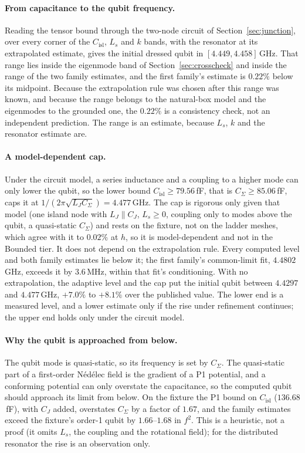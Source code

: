 \documentclass{anvil-paper}
\newcommand{\Cisl}{C_{\mathrm{isl}}}
\begin{document}
\paragraph{From capacitance to the qubit frequency.}
Reading the tensor bound through the two-node circuit of
Section~\ref{sec:junction}, over every corner of the $\Cisl$, $L_s$ and
$k$ bands, with the resonator at its extrapolated estimate, gives the
initial dressed qubit in $[4.449, 4.458]$\,GHz. That range lies inside the
eigenmode band of Section~\ref{sec:crosscheck} and inside the range of the
two family estimates, and the first family's estimate is $0.22\%$ below
its midpoint. Because the extrapolation rule was chosen after this range
was known, and because the range belongs to the natural-box model and the
eigenmodes to the grounded one, the $0.22\%$ is a consistency check, not
an independent prediction. The range is an estimate, because $L_s$, $k$
and the resonator estimate are.

\paragraph{A model-dependent cap.}
Under the circuit model, a series inductance and a coupling to a higher
mode can only lower the qubit, so the lower bound $\Cisl \ge 79.56$\,fF,
that is $C_\Sigma \ge 85.06$\,fF, caps it at $1/(2\pi\sqrt{L_J C_\Sigma})
= 4.477$\,GHz. The cap is rigorous only given that model (one island node
with $L_J \parallel C_J$, $L_s \ge 0$, coupling only to modes above the
qubit, a quasi-static $C_\Sigma$) and rests on the fixture, not on the
ladder meshes, which agree with it to $0.02\%$ at $h$, so it is
model-dependent and not in the Bounded tier. It does not depend on the
extrapolation rule. Every computed level and both family
estimates lie below it; the first family's common-limit fit, $4.4802$\,GHz,
exceeds it by $3.6$\,MHz, within that fit's conditioning. With no
extrapolation, the adaptive level and the cap put the initial qubit between
$4.4297$ and $4.477$\,GHz, $+7.0\%$ to $+8.1\%$ over the published value.
The lower end is a measured level, and a lower estimate only if the rise
under refinement continues; the upper end holds only under the circuit
model.

\paragraph{Why the qubit is approached from below.}
The qubit mode is quasi-static, so its frequency is set by $C_\Sigma$. The
quasi-static part of a first-order N\'ed\'elec field is the gradient of a
P1 potential, and a conforming potential can only overstate the
capacitance, so the computed qubit should approach its limit from below. On the fixture the P1 bound on
$\Cisl$ ($136.68$\,fF), with $C_J$ added, overstates $C_\Sigma$ by a factor
of $1.67$, and the family estimates exceed the fixture's order-1 qubit by
$1.66$--$1.68$ in $f^2$. This is a heuristic, not a proof (it omits $L_s$,
the coupling and the rotational field); for the distributed resonator the
rise is an observation only.
\end{document}
